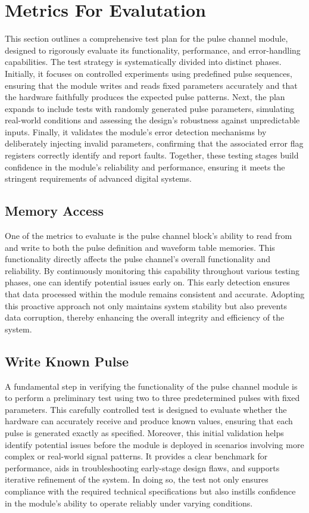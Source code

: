 \chapter{Metrics For Evalutation}

This section outlines a comprehensive test plan for the pulse channel module, designed to rigorously evaluate its functionality, performance, and error-handling capabilities. The test strategy is systematically divided into distinct phases. Initially, it focuses on controlled experiments using predefined pulse sequences, ensuring that the module writes and reads fixed parameters accurately and that the hardware faithfully produces the expected pulse patterns. Next, the plan expands to include tests with randomly generated pulse parameters, simulating real-world conditions and assessing the design's robustness against unpredictable inputs. Finally, it validates the module's error detection mechanisms by deliberately injecting invalid parameters, confirming that the associated error flag registers correctly identify and report faults. Together, these testing stages build confidence in the module's reliability and performance, ensuring it meets the stringent requirements of advanced digital systems.

\section{Memory Access}

One of the metrics to evaluate is the pulse channel block's ability to read from and write to both the pulse definition and waveform table memories. This functionality directly affects the pulse channel's overall functionality and reliability. By continuously monitoring this capability throughout various testing phases, one can identify potential issues early on. This early detection ensures that data processed within the module remains consistent and accurate. Adopting this proactive approach not only maintains system stability but also prevents data corruption, thereby enhancing the overall integrity and efficiency of the system.

\section{Write Known Pulse}

A fundamental step in verifying the functionality of the pulse channel module is to perform a preliminary test using two to three predetermined pulses with fixed parameters. This carefully controlled test is designed to evaluate whether the hardware can accurately receive and produce known values, ensuring that each pulse is generated exactly as specified. Moreover, this initial validation helps identify potential issues before the module is deployed in scenarios involving more complex or real-world signal patterns. It provides a clear benchmark for performance, aids in troubleshooting early-stage design flaws, and supports iterative refinement of the system. In doing so, the test not only ensures compliance with the required technical specifications but also instills confidence in the module's ability to operate reliably under varying conditions.

